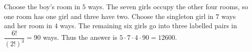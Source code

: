 Choose the boy's room in $5$ ways. The seven girls occupy the other four rooms, so one room has one girl and three have two. Choose the singleton girl in $7$ ways and her room in $4$ ways. The remaining six girls go into three labelled pairs in $\dfrac{6!}{(2!)^3}=90$ ways. Thus the answer is $5\cdot7\cdot4\cdot90=\boxed{12600}$.
